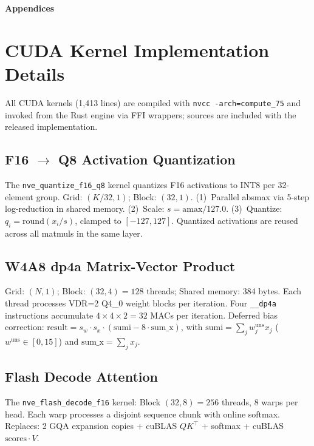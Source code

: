 \documentclass{article}
\begin{document}
\newpage
\appendix

\begin{center}
\Large\textbf{Appendices}
\end{center}
\vspace{0.5em}

\section{CUDA Kernel Implementation Details}
\label{app:kernels}

All CUDA kernels (1,413 lines) are compiled with \texttt{nvcc -arch=compute\_75}
and invoked from the Rust engine via FFI wrappers; sources are included with the
released implementation.

\subsection{F16 $\to$ Q8 Activation Quantization}

The \texttt{nve\_quantize\_f16\_q8} kernel quantizes F16 activations to INT8 per
32-element group. Grid: $(K/32, 1)$; Block: $(32, 1)$.
(1)~Parallel absmax via 5-step log-reduction in shared memory.
(2)~Scale: $s = \text{amax} / 127.0$.
(3)~Quantize: $q_i = \text{round}(x_i / s)$, clamped to $[-127, 127]$.
Quantized activations are reused across all matmuls in the same layer.

\subsection{W4A8 dp4a Matrix-Vector Product}

Grid: $(N, 1)$; Block: $(32, 4) = 128$ threads; Shared memory: 384 bytes.
Each thread processes VDR=2 Q4\_0 weight blocks per iteration. Four
\texttt{\_\_dp4a} instructions accumulate $4 \times 4 \times 2 = 32$ MACs per iteration.
Deferred bias correction: $\text{result} = s_w \cdot s_x \cdot
(\text{sumi} - 8 \cdot \text{sum\_x})$, with $\text{sumi} = \sum_j w_j^{\text{uns}} x_j$
($w^{\text{uns}} \in [0,15]$) and $\text{sum\_x} = \sum_j x_j$.

\subsection{Flash Decode Attention}

The \texttt{nve\_flash\_decode\_f16} kernel: Block $(32, 8) = 256$ threads, 8 warps per
head. Each warp processes a disjoint sequence chunk with online softmax. Replaces: 2 GQA
expansion copies + cuBLAS $QK^\top$ + softmax + cuBLAS $\text{scores} \cdot V$.
\end{document}
